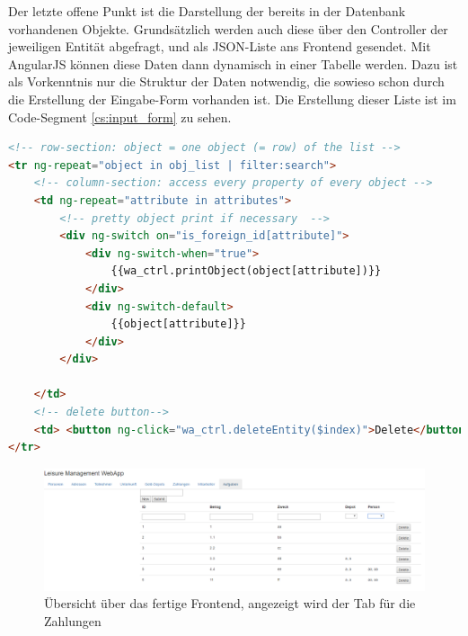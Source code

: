 Der letzte offene Punkt ist die Darstellung der bereits in der Datenbank vorhandenen Objekte. Grundsätzlich werden auch diese über den Controller der jeweiligen Entität abgefragt, und als JSON-Liste ans Frontend gesendet. Mit AngularJS können diese Daten dann dynamisch in einer Tabelle werden. Dazu ist als Vorkenntnis nur die Struktur der Daten notwendig, die sowieso schon durch die Erstellung der Eingabe-Form vorhanden ist. Die Erstellung dieser Liste ist im Code-Segment \ref{cs:input_form} zu sehen.

\scriptsize
\begin{lstlisting}[caption=index.html, label=cs:input_form, language=HTML]
<!-- row-section: object = one object (= row) of the list -->
<tr ng-repeat="object in obj_list | filter:search">
	<!-- column-section: access every property of every object -->
	<td ng-repeat="attribute in attributes">
		<!-- pretty object print if necessary  -->
		<div ng-switch on="is_foreign_id[attribute]">
			<div ng-switch-when="true">
				{{wa_ctrl.printObject(object[attribute])}}
			</div>
			<div ng-switch-default>
				{{object[attribute]}}
			</div>
		</div>
	
	</td>
	<!-- delete button-->
	<td> <button ng-click="wa_ctrl.deleteEntity($index)">Delete</button> </td>
</tr>
\end{lstlisting}
\normalsize 

\begin{figure}
\centering
\includegraphics[width=1.4\linewidth, angle=90]{4_frontend/pics/frontend_complete}
\caption{Übersicht über das fertige Frontend, angezeigt wird der Tab für die Zahlungen}
\label{fig:frontend_complete}
\end{figure}


